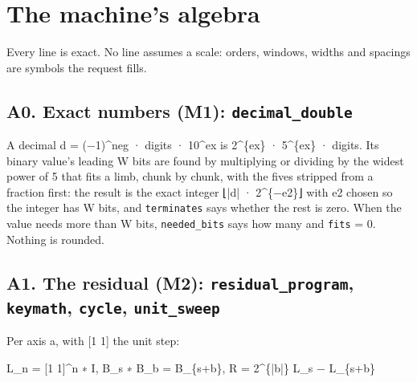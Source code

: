 \section{\texorpdfstring{The machine's algebra}{The machine's algebra}}

Every line is exact. No line assumes a scale: orders, windows, widths and spacings are symbols the request fills.

\subsection{\texorpdfstring{A0. Exact numbers (M1): \texttt{decimal\_\allowbreak{}double}}{A0. Exact numbers (M1): decimal\_double}}

A decimal d = (−1)\textasciicircum{}neg · digits · 10\textasciicircum{}ex is 2\textasciicircum{}\{ex\} · 5\textasciicircum{}\{ex\} · digits. Its binary value's leading W bits are found by multiplying or dividing by the widest power of 5 that fits a limb, chunk by chunk, with the fives stripped from a fraction first: the result is the exact integer ⌊|d| · 2\textasciicircum{}\{−e2\}⌋ with e2 chosen so the integer has W bits, and \texttt{terminates} says whether the rest is zero. When the value needs more than W bits, \texttt{needed\_\allowbreak{}bits} says how many and \texttt{fits} = 0. Nothing is rounded.

\subsection{\texorpdfstring{A1. The residual (M2): \texttt{residual\_\allowbreak{}program}, \texttt{keymath}, \texttt{cycle}, \texttt{unit\_\allowbreak{}sweep}}{A1. The residual (M2): residual\_program, keymath, cycle, unit\_sweep}}

Per axis a, with [1 1] the unit step:

L\_\allowbreak{}n = [1 1]\textasciicircum{}n ∗ I,  B\_\allowbreak{}s ∗ B\_\allowbreak{}b = B\_\allowbreak{}\{s+b\},  R = 2\textasciicircum{}\{|b|\} L\_\allowbreak{}s − L\_\allowbreak{}\{s+b\}

